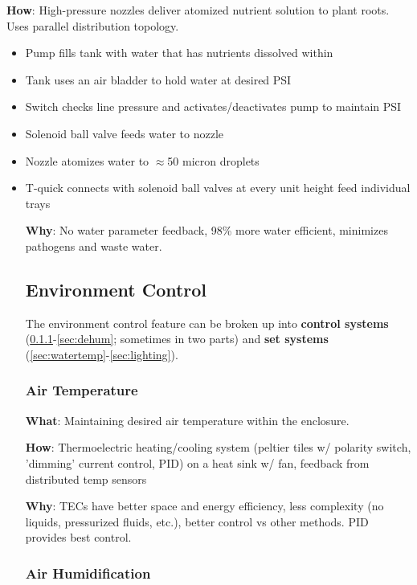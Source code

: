 \documentclass{report}
\begin{document}
\textbf{How}: High-pressure nozzles deliver atomized nutrient solution to plant roots. Uses parallel distribution topology.
\begin{itemize}
    \item Pump fills tank with water that has nutrients dissolved within
    \item Tank uses an air bladder to hold water at desired PSI
    \item Switch checks line pressure and activates/deactivates pump to maintain PSI
    \item Solenoid ball valve feeds water to nozzle
    \item Nozzle atomizes water to $\approx$50 micron droplets
    \item T-quick connects with solenoid ball valves at every unit height feed individual trays

\textbf{Why}: No water parameter feedback, 98\% more water efficient, minimizes pathogens and waste water.

\subsection{Environment Control}
\label{sec:environment}

The environment control feature can be broken up into \textbf{control systems} (\ref{sec:airtemp}-\ref{sec:dehum}; sometimes in two parts) and \textbf{set systems} (\ref{sec:watertemp}-\ref{sec:lighting}).

\subsubsection{Air Temperature}
\label{sec:airtemp}

\textbf{What}: Maintaining desired air temperature within the enclosure.

\textbf{How}: Thermoelectric heating/cooling system (peltier tiles w/ polarity switch, 'dimming' current control, PID) on a heat sink w/ fan, feedback from distributed temp sensors

\textbf{Why}: TECs have better space and energy efficiency, less complexity (no liquids, pressurized fluids, etc.), better control vs other methods. PID provides best control.

\subsubsection{Air Humidification}
\label{sec:airhum}


\end{itemize}
\end{document}
